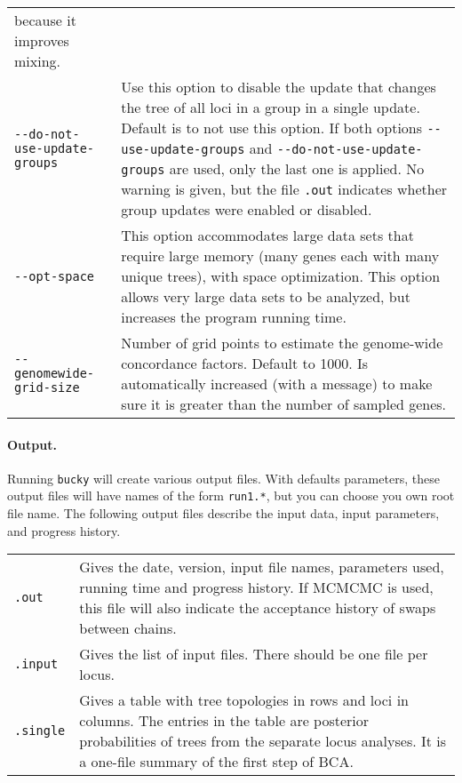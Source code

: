 \documentclass[12pt,english,final,letterpaper]{article}
\begin{document}
\begin{tabular}{l|p{4.4in}}
because it improves mixing.\\
\verb+--do-not-use-update-groups+&Use this option to disable the update that 
changes the tree of all loci in a group in a single update. Default is to 
{\sc not} use this option. If both options \verb+--use-update-groups+ and 
\verb+--do-not-use-update-groups+ are used, only the last one is applied. 
No warning is given, but the file {\tt .out} indicates
whether group updates were enabled or disabled.\\
\verb+--opt-space+&This option accommodates large data sets that require large 
memory (many genes each with many unique trees), with space optimization. 
This option allows very large data sets to be analyzed, but increases the 
program running time.\\
\verb+--genomewide-grid-size+&Number of grid points to estimate the 
genome-wide concordance factors. Default to 1000. Is automatically increased
(with a message) to make sure it is greater than the number of sampled genes.
\end{tabular}


\paragraph{Output.}
Running {\tt bucky} will create various output files. With defaults 
parameters, these output files will have names of the form {\tt run1.*}, 
but you can choose you own root file name.
The following output files describe the input data, input parameters, and
progress history.
\bigskip

\noindent
\begin{tabular}{l|p{5.7in}}
{\tt .out}& Gives the date, version, input file names, 
parameters used, running time and progress history. If MCMCMC is used, 
this file will also indicate the acceptance history of swaps between chains.\\
{\tt .input}& Gives the list of input files. There should be one file 
per locus.\\
{\tt .single}& Gives a table with tree topologies in rows and loci in 
columns. The entries in the table are posterior probabilities of trees from the
separate locus analyses. It is a one-file summary of the first step of BCA.\\
\end{tabular}

\bigskip\bigskip
\bigskip
\end{document}
